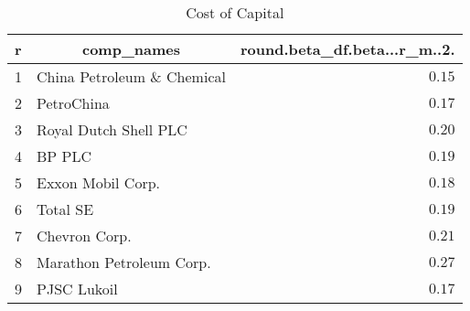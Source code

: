 \begin{table}[!tbp]
\caption{Cost of Capital\label{r}} 
\begin{center}
\begin{tabular}{llr}
\hline\hline
\multicolumn{1}{l}{r}&\multicolumn{1}{c}{comp_names}&\multicolumn{1}{c}{round.beta_df.beta...r_m..2.}\tabularnewline
\hline
1&China Petroleum \& Chemical&$0.15$\tabularnewline
2&PetroChina&$0.17$\tabularnewline
3&Royal Dutch Shell PLC&$0.20$\tabularnewline
4&BP PLC&$0.19$\tabularnewline
5&Exxon Mobil Corp.&$0.18$\tabularnewline
6&Total SE&$0.19$\tabularnewline
7&Chevron Corp.&$0.21$\tabularnewline
8&Marathon Petroleum Corp.&$0.27$\tabularnewline
9&PJSC Lukoil&$0.17$\tabularnewline
\hline
\end{tabular}\end{center}
\end{table}
